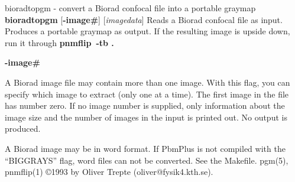 %

\newpage
%

bioradtopgm - convert a Biorad confocal file into a portable graymap
{\bf bioradtopgm}
{\rm [}{\bf -image\#}{\rm ]}
{\rm [}{\it imagedata}{\rm ]}
Reads a Biorad confocal file as input.
Produces a portable graymap as output.
If the resulting image is upside down, run it through
{\bf pnmflip\ -tb .}
\begin{TPlist}{{\bf -image\#}}
\item[{{\bf -image\#}}]
A Biorad image file may contain more than one image. With this flag,
you can specify which image to extract (only one at a time). The first
image in the file has number zero. If no
image number is supplied, only information about the image size and
the number of images in the input is printed out. No output is produced.
\end{TPlist}

A Biorad image may be in word format. If PbmPlus is not compiled with the
``BIGGRAYS'' flag, word files can not be converted. See the Makefile.
pgm(5), pnmflip(1)
\copyright 1993 by Oliver Trepte (oliver@fysik4.kth.se).
\nwl
%
 
%

